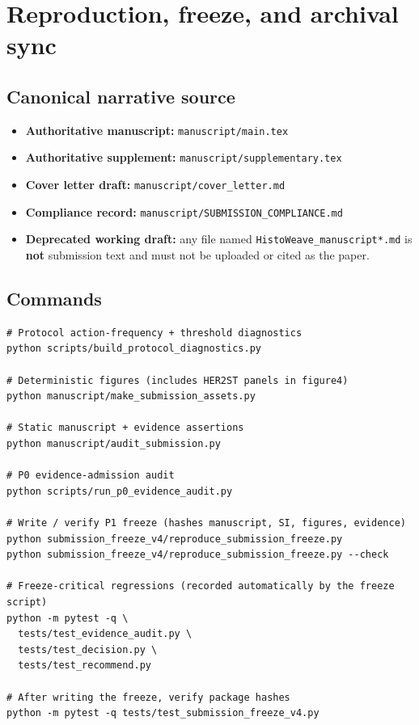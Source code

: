 \documentclass[11pt]{article}
\begin{document}
\clearpage
\section{Reproduction, freeze, and archival sync}

\subsection{Canonical narrative source}

\begin{itemize}
  \item \textbf{Authoritative manuscript:} \texttt{manuscript/main.tex}
  \item \textbf{Authoritative supplement:} \texttt{manuscript/supplementary.tex}
  \item \textbf{Cover letter draft:} \texttt{manuscript/cover\_letter.md}
  \item \textbf{Compliance record:} \texttt{manuscript/SUBMISSION\_COMPLIANCE.md}
  \item \textbf{Deprecated working draft:} any file named
        \texttt{HistoWeave\_manuscript*.md} is \textbf{not} submission text
        and must not be uploaded or cited as the paper.
\end{itemize}

\subsection{Commands}

\begin{verbatim}
# Protocol action-frequency + threshold diagnostics
python scripts/build_protocol_diagnostics.py

# Deterministic figures (includes HER2ST panels in figure4)
python manuscript/make_submission_assets.py

# Static manuscript + evidence assertions
python manuscript/audit_submission.py

# P0 evidence-admission audit
python scripts/run_p0_evidence_audit.py

# Write / verify P1 freeze (hashes manuscript, SI, figures, evidence)
python submission_freeze_v4/reproduce_submission_freeze.py
python submission_freeze_v4/reproduce_submission_freeze.py --check

# Freeze-critical regressions (recorded automatically by the freeze script)
python -m pytest -q \
  tests/test_evidence_audit.py \
  tests/test_decision.py \
  tests/test_recommend.py

# After writing the freeze, verify package hashes
python -m pytest -q tests/test_submission_freeze_v4.py
\end{verbatim}
\end{document}
